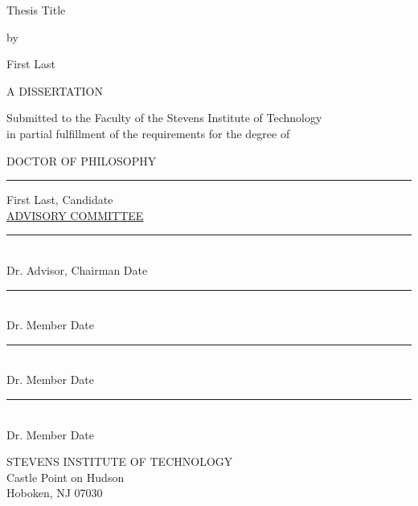 \documentclass[12pt]{report}
\newcommand{\thesistitle}{Thesis Title}
\newcommand{\thesisauthor}{First Last}
\newcommand{\thesisname}{First Last}
\newcommand{\thesischairadvisor}{Dr. Advisor}    %
\newcommand{\committeenameA}{Dr. Member}
\newcommand{\committeenameB}{Dr. Member}
\newcommand{\committeenameC}{Dr. Member}
\newcommand{\graddate}{\the\year} %
\begin{document}

\thispagestyle{empty}
\begin{center}
{
  {\thesistitle}
  \vspace{.15in}
  
    by
    
  \vspace{.15in}
  \thesisauthor
  
  \vspace{.15in}
  
 {A DISSERTATION}\\
  \vspace{.2in}
  \begin{spacing}{1}
    {Submitted to the Faculty of the Stevens Institute of Technology\\
    in partial fulfillment of the requirements for the degree of}
    \end{spacing}
  \vspace{.2in}
  
  {DOCTOR OF PHILOSOPHY}\\
  \vspace{1.0in}
    \hfill 
    \begin{minipage}{80mm}
    \begin{spacing}{ }\noindent \rule{3.2in}{0.1mm}
        \thesisname, Candidate\\[3mm]
        \underline{ADVISORY COMMITTEE}\\[3mm]
        \noindent \rule{3.2in}{0.1mm}\\[-1.3mm]
        {\thesischairadvisor}, Chairman  \hfill{Date}\\[2mm]
        {\noindent \rule{3.2in}{0.1mm}}\\[-1.3mm]
        {\committeenameA}        \hfill{Date}\\[2mm]
        {\noindent \rule{3.2in}{0.1mm}}\\[-1.3mm]
        {\committeenameB}        \hfill{Date}\\[2mm]
        {\noindent \rule{3.2in}{0.1mm}}\\[-1.3mm]
        {\committeenameC}        \hfill{Date}\\[2mm]
    \end{spacing}
  \end{minipage}
  \vfill
  
  {STEVENS INSTITUTE OF TECHNOLOGY\\
  \vspace{-0.05in}
  Castle Point on Hudson\\
  Hoboken, NJ 07030
  }

  {\graddate}
}

\end{center}
\end{document}
